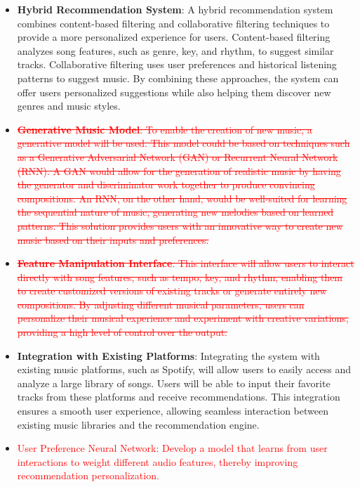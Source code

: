\documentclass[12pt]{article}
\begin{document}
\begin{itemize}
    \item \textbf{Hybrid Recommendation System}: A hybrid recommendation system combines content-based filtering and collaborative filtering techniques to provide a more personalized experience for users. Content-based filtering analyzes song features, such as genre, key, and rhythm, to suggest similar tracks. Collaborative filtering uses user preferences and historical listening patterns to suggest music. By combining these approaches, the system can offer users personalized suggestions while also helping them discover new genres and music styles.
    
    \item \textcolor{red}{\sout{\textbf{Generative Music Model}: To enable the creation of new music, a generative model will be used. This model could be based on techniques such as a Generative Adversarial Network (GAN) or Recurrent Neural Network (RNN). A GAN would allow for the generation of realistic music by having the generator and discriminator work together to produce convincing compositions. An RNN, on the other hand, would be well-suited for learning the sequential nature of music, generating new melodies based on learned patterns. This solution provides users with an innovative way to create new music based on their inputs and preferences.}}
    
    \item \textcolor{red}{\sout{\textbf{Feature Manipulation Interface}: This interface will allow users to interact directly with song features, such as tempo, key, and rhythm, enabling them to create customized versions of existing tracks or generate entirely new compositions. By adjusting different musical parameters, users can personalize their musical experience and experiment with creative variations, providing a high level of control over the output.}}
    
    \item \textbf{Integration with Existing Platforms}: Integrating the system with existing music platforms, such as Spotify, will allow users to easily access and analyze a large library of songs. Users will be able to input their favorite tracks from these platforms and receive recommendations. This integration ensures a smooth user experience, allowing seamless interaction between existing music libraries and the recommendation engine.
    
    \item \textcolor{red}{User Preference Neural Network: Develop a model that learns from user interactions to weight different audio features, thereby improving recommendation personalization.}
\end{itemize}
\end{document}
